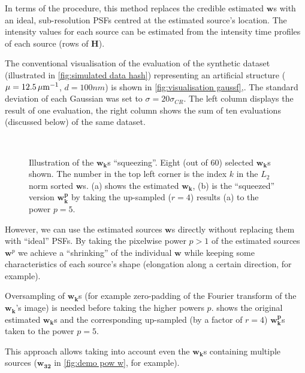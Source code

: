 In terms of the \inmf{} procedure, this method replaces the credible estimated $\bm{w}$s with an ideal, sub-resolution PSFs centred at the estimated source's location. The intensity values for each source can be estimated from the intensity time profiles of each source (rows of $\bm{H}$). 

The conventional visualisation of the \inmf{} evaluation of the synthetic dataset (illustrated in \autoref{fig:simulated data hash}) representing an artificial structure ($\mu = 12.5\, \mathrm{\mu m}^{-1}$, $d=100 \unit{nm}$) is shown in \autoref{fig:visualisation gaussf}\aaa,\bbb. The standard deviation of each Gaussian was set to $\sigma=20\sigma_{CR}$. The left column displays the result of one evaluation, the right column shows the sum of ten evaluations (discussed below) of the same dataset.

\begin{figure}[!hbt]
	\newcommand{\sizef}{.8}			
	\newcommand{\widthfig}{1\textwidth}	
	\centering
	\\
	\caption{Illustration of the $\bm{w_k}$s ``squeezing''. Eight (out of 60) selected $\bm{w_k}$s  shown. The number in the top left corner is the index $k$ in the $L_{2}$ norm sorted $\bm{w}$s. (a) shows the \inmf{} estimated $\bm{w_k}$, (b) is the ``squeezed'' version  $\bm{w_k^p}$ by taking the up-sampled ($r=4$) results (a) to the power $p=5$.}
	\label{fig:demo pow w}	
\end{figure}

However, we can use the estimated sources $\bm{w}$s directly without replacing them with ``ideal'' PSFs. By taking the pixelwise power $p>1$ of the estimated sources $\bm{w}^p$ we achieve a ``shrinking'' of the individual $\bm{w}$ while keeping some characteristics of each source's shape (elongation along a certain direction, for example). 

Oversampling of $\bm{w_k}$s (for example zero-padding of the Fourier transform of the $\bm{w_k}$'s image) is needed before taking the higher powers $p$.  shows the original estimated $\bm{w_k}$s and the corresponding up-sampled (by a factor of $r=4$) $\bm{w^p_k}$s taken to the power $p=5$. 

This approach allows taking into account even the $\bm{w_k}$s containing multiple sources ($\bm{w_{32}}$ in \autoref{fig:demo pow w}, for example).

